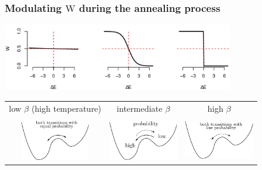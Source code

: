 \begin{frame} \frametitle{Modulating $\mathrm W$ during the annealing process}
  \begin{center}
    \includegraphics[width=10cm]{img/switchfuns}
\vspace{5mm}
  \oident\oident\begin{tabular}[h]{c c c}
    low $\beta$ (high temperature) & intermediate $\beta$  & high $\beta$\\\\
    \includegraphics[width=3cm]{img/section3_fig4}
    & \hspace{-0.5cm}\includegraphics[width=3cm]{img/section3_fig5}
    & \includegraphics[width=3cm]{img/section3_fig6}
  \end{tabular}
\vspace{5mm}
  \end{center}
  \vspace{-2cm}

\\

\end{frame}


